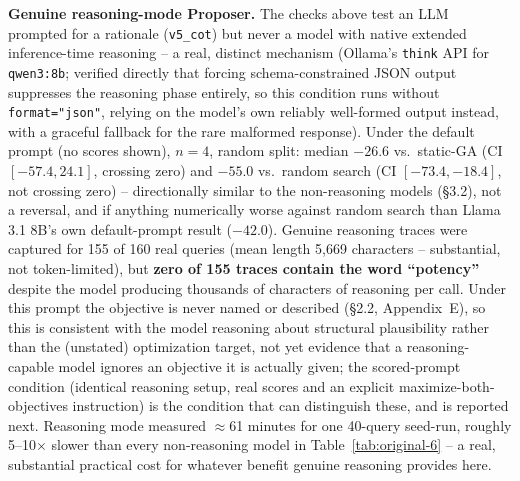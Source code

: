 \documentclass{article}
\begin{document}
\textbf{Genuine reasoning-mode Proposer.} The checks above test an LLM prompted for a rationale (\texttt{v5\_cot}) but never a model with native extended inference-time reasoning -- a real, distinct mechanism (Ollama's \texttt{think} API for \texttt{qwen3:8b}; verified directly that forcing schema-constrained JSON output suppresses the reasoning phase entirely, so this condition runs without \texttt{format="json"}, relying on the model's own reliably well-formed output instead, with a graceful fallback for the rare malformed response). Under the default prompt (no scores shown), $n=4$, random split: median $-26.6$ vs.\ static-GA (CI $[-57.4,24.1]$, crossing zero) and $-55.0$ vs.\ random search (CI $[-73.4,-18.4]$, not crossing zero) -- directionally similar to the non-reasoning models (\S3.2), not a reversal, and if anything numerically worse against random search than Llama 3.1 8B's own default-prompt result ($-42.0$). Genuine reasoning traces were captured for 155 of 160 real queries (mean length 5{,}669 characters -- substantial, not token-limited), but \textbf{zero of 155 traces contain the word ``potency''} despite the model producing thousands of characters of reasoning per call. Under this prompt the objective is never named or described (\S2.2, Appendix~E), so this is consistent with the model reasoning about structural plausibility rather than the (unstated) optimization target, not yet evidence that a reasoning-capable model ignores an objective it is actually given; the scored-prompt condition (identical reasoning setup, real scores and an explicit maximize-both-objectives instruction) is the condition that can distinguish these, and is reported next. Reasoning mode measured $\approx$61 minutes for one 40-query seed-run, roughly 5--10$\times$ slower than every non-reasoning model in Table~\ref{tab:original-6} -- a real, substantial practical cost for whatever benefit genuine reasoning provides here.
\end{document}
